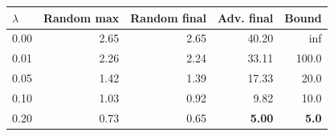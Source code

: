 \footnotesize
\begin{tabular}{lrrrr}
\toprule
$\lambda$ & Random max & Random final & Adv. final & Bound \\
\midrule
0.00 & 2.65 & 2.65 & 40.20 & inf \\
0.01 & 2.26 & 2.24 & 33.11 & 100.0 \\
0.05 & 1.42 & 1.39 & 17.33 & 20.0 \\
0.10 & 1.03 & 0.92 & 9.82 & 10.0 \\
0.20 & 0.73 & 0.65 & \textbf{5.00} & \textbf{5.0} \\
\bottomrule
\end{tabular}
